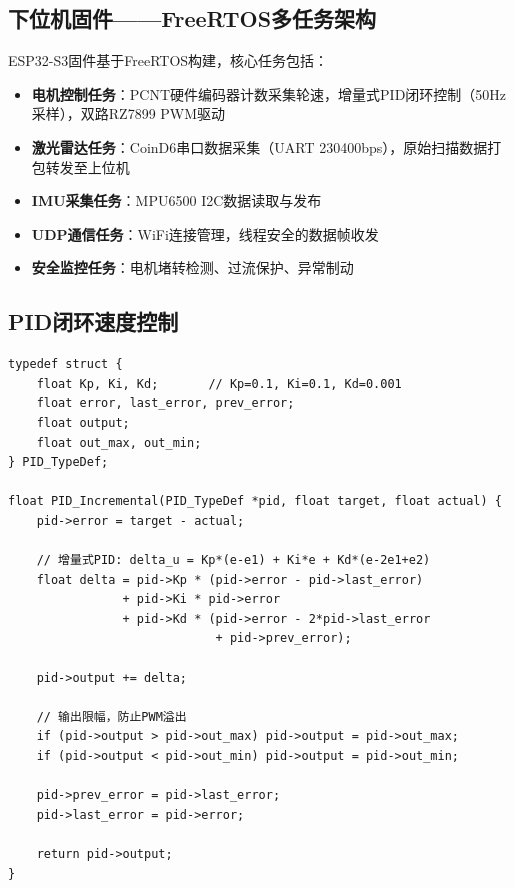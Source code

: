 \documentclass[12pt,a4paper]{ctexart}
\begin{document}
\subsection{下位机固件——FreeRTOS多任务架构}

ESP32-S3固件基于FreeRTOS构建，核心任务包括：

\begin{itemize}
    \item \textbf{电机控制任务}：PCNT硬件编码器计数采集轮速，增量式PID闭环控制（50Hz采样），双路RZ7899 PWM驱动
    \item \textbf{激光雷达任务}：CoinD6串口数据采集（UART 230400bps），原始扫描数据打包转发至上位机
    \item \textbf{IMU采集任务}：MPU6500 I2C数据读取与发布
    \item \textbf{UDP通信任务}：WiFi连接管理，线程安全的数据帧收发
    \item \textbf{安全监控任务}：电机堵转检测、过流保护、异常制动
\end{itemize}

\subsection{PID闭环速度控制}

\begin{lstlisting}[style=cstyle, caption={增量式PID速度控制器（50Hz采样周期）}]
typedef struct {
    float Kp, Ki, Kd;       // Kp=0.1, Ki=0.1, Kd=0.001
    float error, last_error, prev_error;
    float output;
    float out_max, out_min;
} PID_TypeDef;

float PID_Incremental(PID_TypeDef *pid, float target, float actual) {
    pid->error = target - actual;

    // 增量式PID: delta_u = Kp*(e-e1) + Ki*e + Kd*(e-2e1+e2)
    float delta = pid->Kp * (pid->error - pid->last_error)
                + pid->Ki * pid->error
                + pid->Kd * (pid->error - 2*pid->last_error
                             + pid->prev_error);

    pid->output += delta;

    // 输出限幅，防止PWM溢出
    if (pid->output > pid->out_max) pid->output = pid->out_max;
    if (pid->output < pid->out_min) pid->output = pid->out_min;

    pid->prev_error = pid->last_error;
    pid->last_error = pid->error;

    return pid->output;
}
\end{lstlisting}
\end{document}
